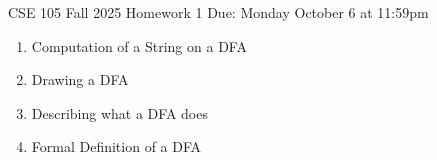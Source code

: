 \documentclass[10pt,letterpaper,unboxed,cm]{article}
\begin{document}
\hfill{CSE 105 Fall 2025}
\hfill{Homework 1}
\hfill{Due: Monday October 6 at 11:59pm}

\begin{enumerate}
\item Computation of a String on a DFA \newline 
\item Drawing a DFA \newline 
\item Describing what a DFA does \newline 
\item Formal Definition of a DFA \newline

\end{enumerate}
\end{document}
